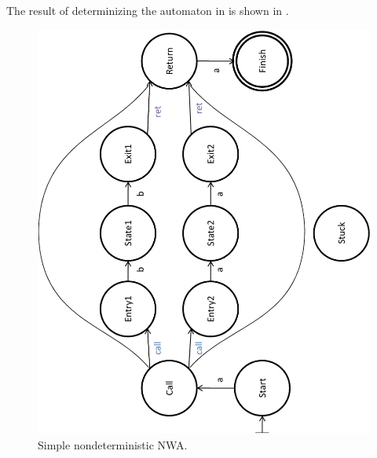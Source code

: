 The result of determinizing the automaton in  is shown in
.

\begin{figure}[p]
  \centering
    \includegraphics[width=12cm]{Figures/Figure16}
  \caption{Simple nondeterministic NWA.}
  \label{Fig:Det1}
\end{figure}


